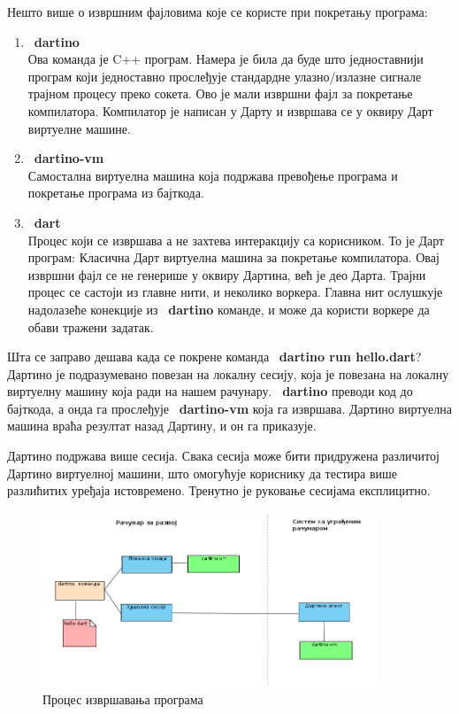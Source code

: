 \documentclass[12pt,oneside]{memoir}
\begin{document}
Нешто више о извршним фајловима које се користе при покретању програма:
\begin{enumerate}
\item ~\textbf{dartino}\\
Ова команда је C++ програм. Намера је била да буде што једноставнији програм који једноставно прослеђује стандардне улазно/излазне сигнале трајном процесу преко сокета. Ово је мали извршни фајл за покретање компилатора. Компилатор је написан у Дарту и извршава се у оквиру Дарт виртуелне машине. 
\item ~\textbf{dartino-vm} \\
Самостална виртуелна машина која подржава превођење програма и покретање програма из бајткода.
\item ~\textbf{dart} \\
Процес који се извршава а не захтева интеракцију са корисником. То је Дарт програм: Класична Дарт виртуелна машина за покретање компилатора. Овај извршни фајл се не генерише у оквиру Дартина, већ је део Дарта. Трајни процес се састоји из главне нити, и неколико воркера. Главна нит ослушкује надолазеће конекције из ~\textbf{dartino} команде, и може да користи воркере да обави тражени задатак.
\end{enumerate}

Шта се заправо дешава када се покрене команда ~\textbf{dartino run hello.dart}? Дартино је подразумевано повезан на локалну сесију, која је повезана на локалну виртуелну машину која ради на нашем рачунару. ~\textbf{dartino} преводи код до бајткода, а онда га прослеђује ~\textbf{dartino-vm} која га извршава. Дартино виртуелна машина враћа резултат назад Дартину, и он га приказује.

Дартино подржава више сесија. Свака сесија може бити придружена различитој Дартино виртуелној машини, што омогућује кориснику да тестира више разлићитих уређаја истовремено. Тренутно је руковање сесијама експлицитно.

\begin{figure}[!ht]
  \centering
  \includegraphics[width=0.9\textwidth]{sesije.png}
  \caption{Процес извршавања програма}
  \label{fig:izvrsavanje}
\end{figure}
\end{document}
